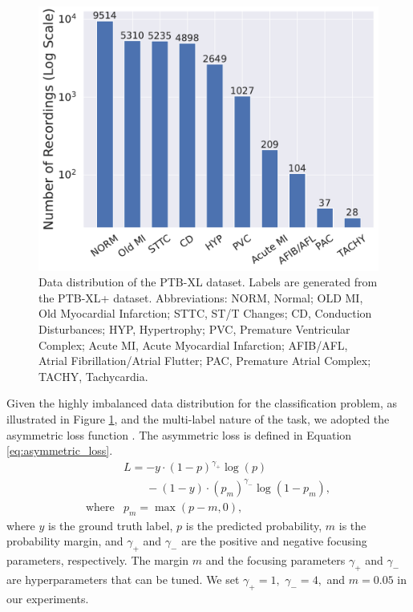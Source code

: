 \begin{figure}[!htp]
\centering
\includegraphics[width=\linewidth]{images/data_distribution.pdf}
\caption{Data distribution of the PTB-XL dataset. Labels are generated from the PTB-XL+ dataset. Abbreviations: NORM, Normal; OLD MI, Old Myocardial Infarction; STTC, ST/T Changes; CD, Conduction Disturbances; HYP, Hypertrophy; PVC, Premature Ventricular Complex; Acute MI, Acute Myocardial Infarction; AFIB/AFL, Atrial Fibrillation/Atrial Flutter; PAC, Premature Atrial Complex; TACHY, Tachycardia.}
\label{fig:data-distribution}
\end{figure}

Given the highly imbalanced data distribution for the classification problem, as illustrated in Figure \ref{fig:data-distribution}, and the multi-label nature of the task, we adopted the asymmetric loss function \cite{ridnik2021asymmetric_loss}. The asymmetric loss is defined in Equation \eqref{eq:asymmetric_loss}.
\begin{equation}
\label{eq:asymmetric_loss}
\begin{array}{ll}
& L = -y \cdot (1-p)^{\gamma_{+}} \log(p) \\
& \phantom{L = } - (1-y) \cdot (p_m)^{\gamma_{-}} \log(1-p_m), \\
\text{where} & p_m = \max(p - m, 0),
\end{array}
\end{equation}
where $y$ is the ground truth label, $p$ is the predicted probability, $m$ is the probability margin, and $\gamma_{+}$ and $\gamma_{-}$ are the positive and negative focusing parameters, respectively. The margin $m$ and the focusing parameters $\gamma_{+}$ and $\gamma_{-}$ are hyperparameters that can be tuned. We set $\gamma_{+} = 1,$ $\gamma_{-} = 4,$ and $m = 0.05$ in our experiments.

